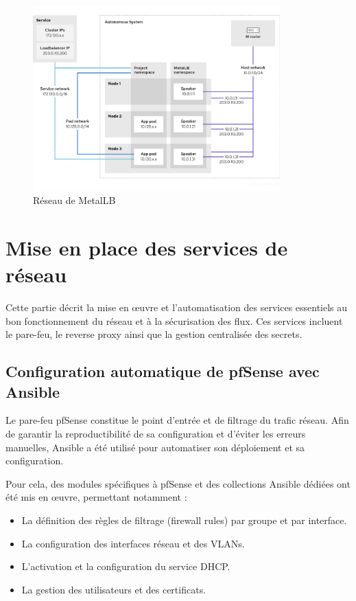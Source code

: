\begin{figure}[H]
	\centering
	\includegraphics[width=0.85\textwidth]{figures/Metallb network.png}
	\caption{Réseau de MetalLB}
\end{figure}

\section{Mise en place des services de réseau}

Cette partie décrit la mise en œuvre et l’automatisation des services essentiels au bon fonctionnement du réseau et à la sécurisation des flux. Ces services incluent le pare-feu, le reverse proxy ainsi que la gestion centralisée des secrets.

\subsection{Configuration automatique de pfSense avec Ansible}

Le pare-feu pfSense constitue le point d’entrée et de filtrage du trafic réseau. Afin de garantir la reproductibilité de sa configuration et d’éviter les erreurs manuelles, Ansible a été utilisé pour automatiser son déploiement et sa configuration.

Pour cela, des modules spécifiques à pfSense et des collections Ansible dédiées ont été mis en œuvre, permettant notamment :
\begin{itemize}
	\item La définition des règles de filtrage (firewall rules) par groupe et par interface.
	\item La configuration des interfaces réseau et des VLANs.
	\item L’activation et la configuration du service DHCP.
	\item La gestion des utilisateurs et des certificats.
\end{itemize}

